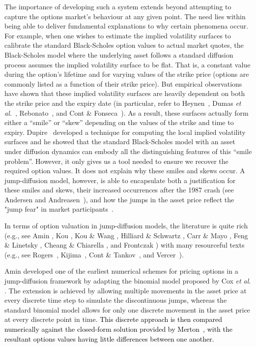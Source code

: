 The importance of developing such a system extends beyond attempting to capture the options market's behaviour at any given point. The need lies within being able to deliver fundamental explanations to why certain phenomena occur. For example, when one wishes to estimate the implied volatility surfaces to calibrate the standard Black-Scholes option values to actual market quotes, the Black-Scholes model where the underlying asset follows a standard diffusion process assumes the implied volatility surface to be flat. That is, a constant value during the option's lifetime and for varying values of the strike price (options are commonly listed as a function of their strike price). But empirical observations have shown that these implied volatility surfaces are heavily dependent on both the strike price and the expiry date (in particular, refer to Heynen~\cite{Heynen1994}, Dumas \emph{et al.}~\cite{Dumas1998}, Rebonato~\cite{Rebonato1999}, and Cont \& Fonseca~\cite{Cont2001, Cont2002}). As a result, these surfaces actually form either a ``smile'' or ``skew'' depending on the values of the strike and time to expiry. Dupire~\cite{Dupire1994} developed a technique for computing the local implied volatility surfaces and he showed that the standard Black-Scholes model with an asset under diffusion dynamics can embody all the distinguishing features of this ``smile problem''. However, it only gives us a tool needed to ensure we recover the required option values. It does not explain why these smiles and skews occur. A jump-diffusion model, however, is able to encapsulate both a justification for these smiles and skews, their increased occurrences after the 1987 crash (see Andersen and Andreasen~\cite{Andersen2000}), and how the jumps in the asset price reflect the "jump fear" in market participants~\cite{Cont2004}.

In terms of option valuation in jump-diffusion models, the literature is quite rich (e.g., see Amin \cite{Armin1993}, Kou \cite{Kou2002}, Kou \& Wang \cite{Kou2004}, Hilliard \& Schwartz \cite{Hilliard2005}, Carr \& Mayo \cite{Carr2007}, Feng \& Linetsky \cite{Feng2008}, Cheang \& Chiarella \cite{Cheang2011}, and Frontczak \cite{Frontczak2013}) with many resourceful texts (e.g., see Rogers~\cite{Rogers1997}, Kijima~\cite{Kijima2002}, Cont \& Tankov~\cite{Cont2004}, and Vercer~\cite{Vecer2011}).

Amin \cite{Armin1993} developed one of the earliest numerical schemes for pricing options in a jump-diffusion framework by adapting the binomial model proposed by Cox \emph{et al}. \cite{Cox1979}. The extension is achieved by allowing multiple movements in the asset price at every discrete time step to simulate the discontinuous jumps, whereas the standard binomial model allows for only one discrete movement in the asset price at every discrete point in time. \textcolor{black}{This discrete approach is then compared numerically against the closed-form solution provided by Merton~\cite{Merton1976}, with the resultant options values having little differences between one another.}

